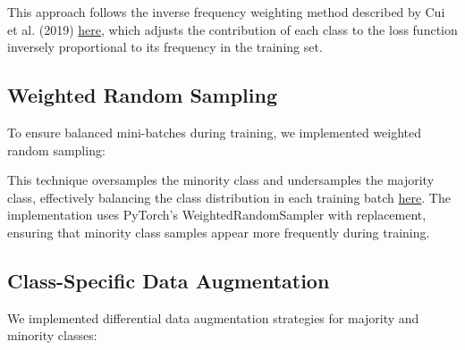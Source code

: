 \documentclass[a4paper,12pt]{article}
\begin{document}


This approach follows the inverse frequency weighting method described by Cui et al. (2019) \href{https://openaccess.thecvf.com/content_CVPR_2019/papers/Cui_Class-Balanced_Loss_Based_on_Effective_Number_of_Samples_CVPR_2019_paper.pdf}{here}, which adjusts the contribution of each class to the loss function inversely proportional to its frequency in the training set.

\subsection{Weighted Random Sampling}
To ensure balanced mini-batches during training, we implemented weighted random sampling:



This technique oversamples the minority class and undersamples the majority class, effectively balancing the class distribution in each training batch \href{https://www.sciencedirect.com/science/article/pii/S0893608018302107}{here}. The implementation uses PyTorch's WeightedRandomSampler with replacement, ensuring that minority class samples appear more frequently during training.

\subsection{Class-Specific Data Augmentation}
We implemented differential data augmentation strategies for majority and minority classes:

\end{document}
